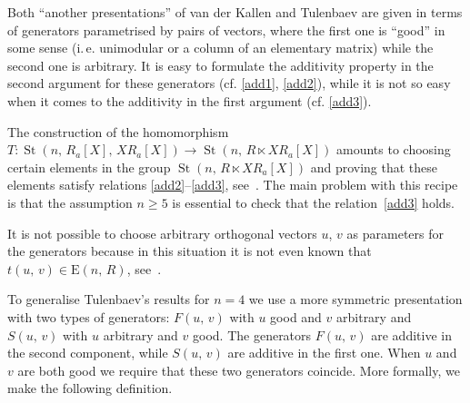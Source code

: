 \documentclass[11pt]{amsart}
\theoremstyle{plain} \declaretheorem[name=Theorem, Refname={Theorem,Theorems}]{tm} \Crefname{tm}{Theorem}{Theorems}
\numberwithin{equation}{section}
\theoremstyle{definition} \newtheorem{df}[lm]{Definition} \Crefname{df}{Definition}{Definitions}
\theoremstyle{remark} \newtheorem{rk}[lm]{Remark} \Crefname{rk}{Remark}{Remarks}
\newcommand{\E}{{\mathrm{E}}}
\newcommand{\St}{\mathop{\mathrm{St}}\nolimits}
\begin{document}
Both ``another presentations'' of van der Kallen and Tulenbaev are given in terms of generators parametrised by pairs of vectors,
 where the first one is ``good'' in some sense  (i.\,e. unimodular or a column of an elementary matrix) while the second one is arbitrary.
It is easy to formulate the additivity property in the second argument for these generators (cf. \eqref{add1}, \eqref{add2}),
while it is not so easy when it comes to the additivity in the first argument (cf. \eqref{add3}).

The construction of the homomorphism $T\colon\St(n,\,R_a[X],\,XR_a[X])\rightarrow\St(n,\,R\ltimes XR_a[X])$
amounts to choosing certain elements in the group $\St(n,\,R\ltimes XR_a[X])$ and proving that these elements satisfy relations \eqref{add2}--\eqref{add3}, see~\cite[Lemmas~1.2 and~1.3\,c)]{Tul}.
The main problem with this recipe is that the assumption $n\geq5$ is essential to check that the relation~\eqref{add3} holds.

It is not possible to choose arbitrary orthogonal vectors $u$, $v$ as parameters for the generators because in this situation it is not even known that $t(u,\,v)\in\E(n,\,R)$, see~\cite{Rao}. 

To generalise Tulenbaev's results for $n=4$ we use a more symmetric presentation with two types of generators: 
$F(u,\,v)$ with $u$ good and $v$ arbitrary and $S(u,\,v)$ with $u$ arbitrary and $v$ good.
The generators $F(u,\,v)$ are additive in the second component, while $S(u,\,v)$ are additive in the first one.
When $u$ and $v$ are both good we require that these two generators coincide.
More formally, we make the following definition.
\end{document}
